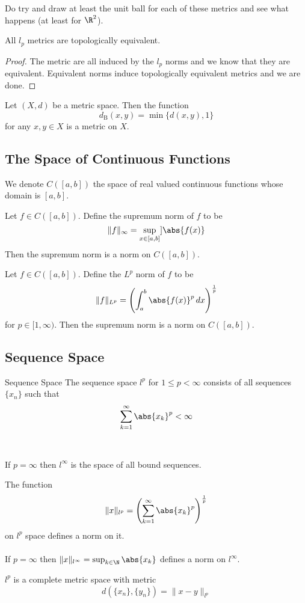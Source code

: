 Do try and draw at least the unit ball for each of these metrics and see what happens (at least for $\R^2$). 

\begin{prp}{}{} All $l_p$ metrics are topologically equivalent. \tcbline
\begin{proof}
The metric are all induced by the $l_p$ norms and we know that they are equivalent. Equivalent norms induce topologically equivalent metrics and we are done. 
\end{proof}
\end{prp}

\begin{prp}{}{} Let $(X,d)$ be a metric space. Then the function $$d_\text{B}(x,y)=\min\{d(x,y),1\}$$ for any $x,y\in X$ is a metric on $X$. 
\end{prp}

\subsection{The Space of Continuous Functions}
\begin{defn}{}{} We denote $C([a,b])$ the space of real valued continuous functions whose domain is $[a,b]$. 
\end{defn}

\begin{prp}{}{} Let $f\in C([a,b])$. Define the supremum norm of $f$ to be $$\|f\|_\infty=\sup_{x\in[a,b]}]\abs{f(x)}$$ Then the supremum norm is a norm on $C([a,b])$. 
\end{prp}

\begin{prp}{}{} Let $f\in C([a,b])$. Define the $L^p$ norm of $f$ to be $$\|f\|_{L^p}=\left(\int_a^b\abs{f(x)}^p\,dx\right)^{\frac{1}{p}}$$ for $p\in[1,\infty)$. Then the supremum norm is a norm on $C([a,b])$. 
\end{prp}

\subsection{Sequence Space}
\begin{defn}{Sequence Space}{} The sequence space $l^p$ for $1\leq p<\infty$ consists of all sequences $\{x_n\}$ such that $$\sum_{k=1}^\infty\abs{x_k}^p<\infty$$ \\~\\
If $p=\infty$ then $l^\infty$ is the space of all bound sequences. 
\end{defn}

\begin{prp}{}{} The function $$\|x\|_{l^p}=\left(\sum_{k=1}^\infty\abs{x_k}^p\right)^{\frac{1}{p}}$$ on $l^p$ space defines a norm on it. \\~\\ If $p=\infty$ then $\|x\|_{l^\infty}=\sup_{k\in\N}\abs{x_k}$ defines a norm on $l^\infty$. 
\end{prp}

\begin{prp}{}{} $l^p$ is a complete metric space with metric $$d(\{x_n\},\{y_n\})=\|x-y\|_{l^p}$$
\end{prp}